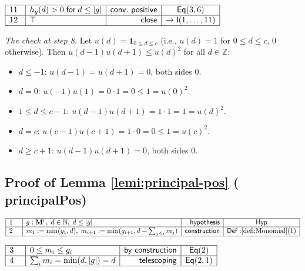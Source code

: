 \documentclass[11pt,reqno]{amsart}
\providecommand{\N}{\mathbb{N}}
\providecommand{\Z}{\mathbb{Z}}
\begin{document}
\nointerlineskip\noindent$%
\begin{array}{|m{0.5cm}|l|r|c|}
\hline
11 & h_{g}(d)>0\;\mathsf{for}\;d\le|g| & \mathsf{conv.\ positive} & \mathsf{%
Eq}(3,6) \\ \hline
12 & \top & \mathsf{close} & \to\mathsf{I}(1,\dots,11) \\ \hline
\end{array}%
$

\medskip \noindent\textit{The check at step 8.} Let $u(d)=\mathbf{1}_{0\le
d\le c}$ (i.e., $u(d)=1$ for $0\le d\le c$, $0$ otherwise). Then $%
u(d-1)u(d+1)\le u(d)^{2}$ for all $d\in\Z$:

\begin{itemize}
\item $d\le -1$: $u(d-1)=u(d+1)=0$, both sides 0.

\item $d=0$: $u(-1)u(1)=0\cdot 1=0\le 1=u(0)^{2}$.

\item $1\le d\le c-1$: $u(d-1)u(d+1)=1\cdot 1=1=u(d)^{2}$.

\item $d=c$: $u(c-1)u(c+1)=1\cdot 0=0\le 1=u(c)^{2}$.

\item $d\ge c+1$: $u(d-1)u(d+1)=0$, both sides 0.
\end{itemize}

\medskip


\subsection*{Proof of Lemma \protect\ref{lemi:principal-pos} (\textsf{%
principalPos})}

\noindent$%
\begin{array}{|m{0.5cm}|l|r|c|}
\hline
1 & g:\mathbf{M}^{r},\;d\in\N,\;d\le|g| & \mathsf{hypothesis} & \mathsf{Hyp}
\\ \hline
2 & m_{1}:=\min(g_{1},d),\;m_{i+1}:=\min(g_{i+1},d-\sum_{j\le i}m_{j}) & 
\mathsf{construction} & \mathsf{Def:}\ref{defi:Monomial}(1) \\ \hline
\end{array}%
$

\nointerlineskip\noindent$%
\begin{array}{|m{0.5cm}|l|r|c|}
\hline
3 & 0\le m_{i}\le g_{i} & \mathsf{by\ construction} & \mathsf{Eq}(2) \\ 
\hline
4 & \sum_{i}m_{i}=\min(d,|g|)=d & \mathsf{telescoping} & \mathsf{Eq}(2,1) \\ 
\hline
\end{array}%
$
\end{document}
